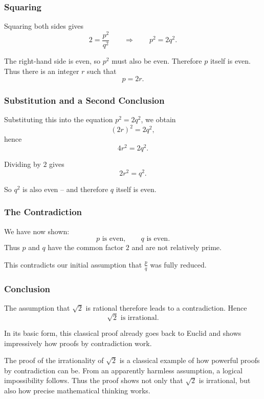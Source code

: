 \subsubsection*{Squaring}

Squaring both sides gives
\[
2 = \frac{p^2}{q^2}
\qquad\Rightarrow\qquad
p^2 = 2q^2.
\]

The right-hand side is even, so $p^2$ must also be even.
Therefore $p$ itself is even. Thus there is an integer $r$ such that
\[
p = 2r.
\]

\subsubsection*{Substitution and a Second Conclusion}

Substituting this into the equation $p^2 = 2q^2$, we obtain
\[
(2r)^2 = 2q^2,
\]
hence
\[
4r^2 = 2q^2.
\]

Dividing by $2$ gives
\[
2r^2 = q^2.
\]

So $q^2$ is also even -- and therefore $q$ itself is even.

\subsubsection*{The Contradiction}

We have now shown:
\[
p \text{ is even}, \qquad q \text{ is even}.
\]
Thus $p$ and $q$ have the common factor $2$ and are not
relatively prime.

This contradicts our initial assumption that $\frac{p}{q}$ was fully
reduced.

\subsubsection*{Conclusion}

The assumption that $\sqrt{2}$ is rational therefore leads to a contradiction.
Hence
\[
\sqrt{2} \text{ is irrational.}
\]

In its basic form, this classical proof already goes back to Euclid
and shows impressively how proofs by contradiction work.

\begin{DidacticBox}
	\label{box:proof-elegant}
	The proof of the irrationality of $\sqrt{2}$ is a classical
	example of how powerful proofs by contradiction can be.
	From an apparently harmless assumption, a logical impossibility follows.
	Thus the proof shows not only that $\sqrt{2}$ is irrational,
	but also how precise mathematical thinking works.
\end{DidacticBox}

